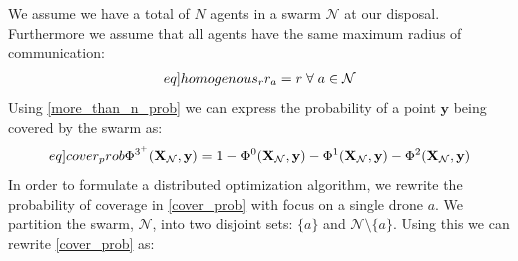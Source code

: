 We assume we have a total of $N$ agents in a swarm $\mathcal{N}$ at our disposal. Furthermore we assume that all agents have the same maximum radius of communication:
\begin{equation}\label[eq]{homogenous_r}
  \begin{split}
    r_{a} &= r\;\forall\; a\in\mathcal{N}\\
  \end{split}
\end{equation}
Using \eqref{more_than_n_prob} we can express the probability of a point $\mathbf{y}$ being covered by the swarm as:
\begin{equation}\label[eq]{cover_prob}
  \Phi^{3^{+}}(\mathbf{X}_{\mathcal{N}}, \mathbf{y}) = 1 - \Phi^{0}(\mathbf{X}_{\mathcal{N}}, \mathbf{y}) - \Phi^{1}(\mathbf{X}_{\mathcal{N}}, \mathbf{y}) - \Phi^{2}(\mathbf{X}_{\mathcal{N}}, \mathbf{y})
\end{equation}
In order to formulate a distributed optimization algorithm, we rewrite the probability of coverage in \eqref{cover_prob} with focus on a single drone $a$.
We partition the swarm, $\mathcal{N}$, into two disjoint sets: $\{a\}$ and $\mathcal{N}\setminus\{a\}$. Using this we can rewrite \eqref{cover_prob} as:
